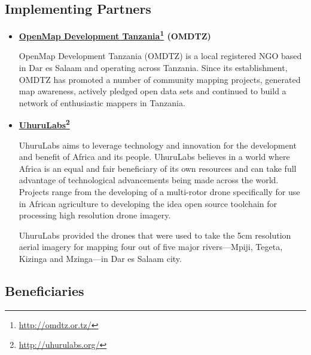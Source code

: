 \documentclass[a4paper,12pt,twoside]{article}
\begin{document}
\subsection{Implementing Partners}

    \begin{itemize}
        \item \textbf{\href{http://omdtz.or.tz/}{OpenMap Development Tanzania}\footnote{\url{http://omdtz.or.tz/}} (OMDTZ)} %
        
        OpenMap Development Tanzania (OMDTZ) is a local registered NGO based in Dar es Salaam and operating across Tanzania. Since its establishment, OMDTZ has promoted a number of community mapping projects, generated map awareness, actively pledged open data sets and continued to build a network of enthusiastic mappers in Tanzania.
    
        \item \textbf{\href{http://uhurulabs.org/}{UhuruLabs}\footnote{\url{http://uhurulabs.org/}}}
    
        UhuruLabs aims to leverage technology and innovation for the development and benefit of Africa and its people. UhuruLabs believes in a world where Africa is an equal and fair beneficiary of its own resources and can take full advantage of technological advancements being made across the world. Projects range from the developing of a multi-rotor drone specifically for use in African agriculture to developing the idea open source toolchain for processing high resolution drone imagery. 
    
        UhuruLabs provided the drones that were used to take the 5cm resolution aerial imagery for mapping four out of five major rivers---Mpiji, Tegeta, Kizinga and Mzinga---in Dar es Salaam city. %
    
    \end{itemize}

\subsection{Beneficiaries}
\end{document}
